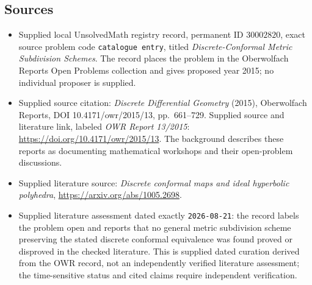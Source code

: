 \documentclass[11pt]{article}
\begin{document}
\subsection{Sources}
\begin{itemize}
\item Supplied local UnsolvedMath registry record, permanent ID \(30002820\), exact source problem code \texttt{catalogue entry}, titled \emph{Discrete-Conformal Metric Subdivision Schemes}. The record places the problem in the Oberwolfach Reports Open Problems collection and gives proposed year 2015; no individual proposer is supplied.
\item Supplied source citation: \emph{Discrete Differential Geometry} (2015), Oberwolfach Reports, DOI 10.4171/owr/2015/13, pp.\ 661--729. Supplied source and literature link, labeled \emph{OWR Report 13/2015}: \url{https://doi.org/10.4171/owr/2015/13}. The background describes these reports as documenting mathematical workshops and their open-problem discussions.
\item Supplied literature source: \emph{Discrete conformal maps and ideal hyperbolic polyhedra}, \url{https://arxiv.org/abs/1005.2698}.
\item Supplied literature assessment dated exactly \texttt{2026-08-21}: the record labels the problem open and reports that no general metric subdivision scheme preserving the stated discrete conformal equivalence was found proved or disproved in the checked literature. This is supplied dated curation derived from the OWR record, not an independently verified literature assessment; the time-sensitive status and cited claims require independent verification.
\end{itemize}
\end{document}
